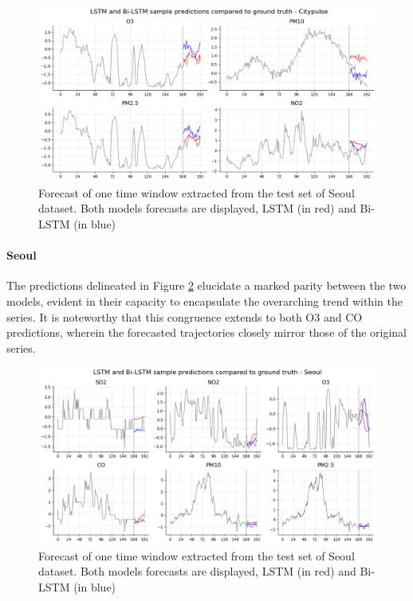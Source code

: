 \begin{figure}[h]
    \centering
    \includegraphics[width=1\linewidth]{images/forecasts_aarhus.png}
    \caption{Forecast of one time window extracted from the test set of Seoul dataset. Both models forecasts are displayed, LSTM (in red) and Bi-LSTM (in blue)}
    \label{fig:forecasts_aarhus}
\end{figure}

\paragraph{Seoul}

The predictions delineated in Figure \ref{fig:forecasts_seoul} elucidate a marked parity between the two models, evident in their capacity to encapsulate the overarching trend within the series. It is noteworthy that this congruence extends to both O3 and CO predictions, wherein the forecasted trajectories closely mirror those of the original series.

\begin{figure}[h]
    \centering
    \includegraphics[width=1\linewidth]{images/forecasts_seoul.png}
    \caption{Forecast of one time window extracted from the test set of Seoul dataset. Both models forecasts are displayed, LSTM (in red) and Bi-LSTM (in blue)}
    \label{fig:forecasts_seoul}
\end{figure}

